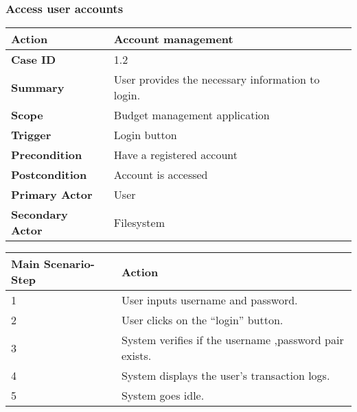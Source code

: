 \documentclass[letterpaper]{article}
\begin{document}
        \subsubsection{Access user accounts}
		
        \begin{center}
	        \begin{tabular}{ | m{5cm} | m{10cm}| } 
	            \hline
	            \textbf{Action} & Account management \\ 
	            \hline
	            \textbf{Case ID} & 1.2 \\ 
	            \hline
	            \textbf{Summary} & User provides the necessary information to login. \\
	            \hline
	            \textbf{Scope} & Budget management application \\ 
	            \hline
	            \textbf{Trigger} & Login button \\
	            \hline
	            \textbf{Precondition} & Have a registered account \\ 
	            \hline
	            \textbf{Postcondition} & Account is accessed \\ 
	            \hline
	            \textbf{Primary Actor} & User \\ 
	            \hline
	            \textbf{Secondary Actor} & Filesystem \\ 
	            \hline
	        \end{tabular}
        
        	\vspace{2mm}
        
			\begin{tabular}{ | m{5cm} | m{10cm}| } 
				\hline
	            \textbf{Main Scenario-Step} & \textbf{Action} \\ 
	            \hline
	            1 & User inputs username and password. \\ 
	            \hline
	            2 & User clicks on the “login” button. \\ 
	            \hline
	            3 & System verifies if the username ,password pair exists. \\ 
	            \hline
	            4 & System displays the user's transaction logs. \\ 
	            \hline
	            5 & System goes idle. \\ 
	            \hline
	        \end{tabular}
        \end{center}
\end{document}
